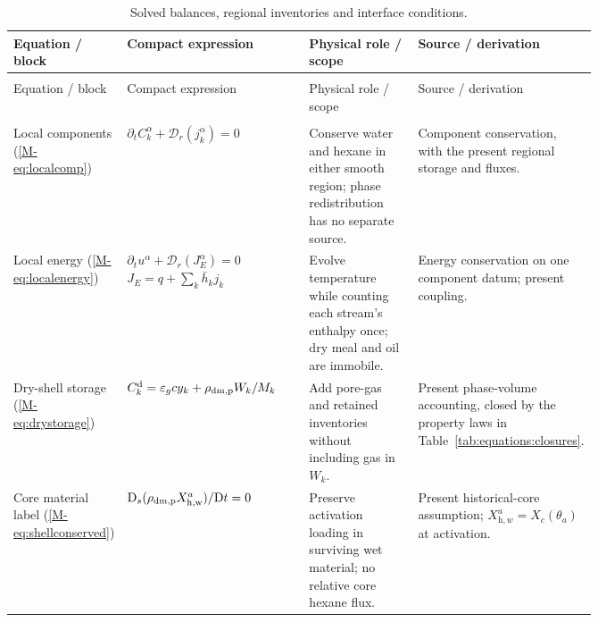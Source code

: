 \begingroup
\small
\setlength{\tabcolsep}{4pt}
\setlength{\LTpre}{6pt}
\setlength{\LTpost}{10pt}
\renewcommand{\arraystretch}{1.12}
\begin{longtable}{@{}>{\raggedright\arraybackslash}p{0.14\linewidth}
>{\raggedright\arraybackslash}p{0.37\linewidth}
>{\raggedright\arraybackslash}p{0.25\linewidth}
>{\raggedright\arraybackslash}p{}@{}}
\caption{Solved balances, regional inventories and interface conditions.}
\label{tab:equations:balances}\\
\toprule
Equation / block & Compact expression & Physical role / scope & Source / derivation\\\midrule
\endfirsthead
\multicolumn{4}{l}{\tablename~\thetable\ (continued)}\\
\toprule
Equation / block & Compact expression & Physical role / scope & Source / derivation\\\midrule
\endhead
\midrule\multicolumn{4}{r}{Continued on next page}\\\endfoot
\bottomrule\endlastfoot
Local components\newline
(\ref*{M-eq:localcomp})
& $\partial_t C_k^\alpha+\mathcal D_r(j_k^\alpha)=0$
& Conserve water and hexane in either smooth region; phase redistribution has no separate source.
& Component conservation, with the present regional storage and fluxes.\\[5pt]
Local energy\newline
(\ref*{M-eq:localenergy})
& $\partial_t u^\alpha+\mathcal D_r(J_E^\alpha)=0$\newline
  $J_E=q+\sum_k\bar h_kj_k$
& Evolve temperature while counting each stream's enthalpy once; dry meal and oil are immobile.
& Energy conservation on one component datum; present coupling.\\[5pt]
Dry-shell storage\newline
(\ref*{M-eq:drystorage})
& $C_k^{\mathrm d}=\varepsilon_gcy_k+\rho_{\mathrm{dm,p}} W_k/M_k$
& Add pore-gas and retained inventories without including gas in $W_k$.
& Present phase-volume accounting, closed by the property laws in Table~\ref{tab:equations:closures}.\\[5pt]
Core material label\newline
(\ref*{M-eq:shellconserved})
& $\mathrm D_s(\rho_{\mathrm{dm,p}}X_{\mathrm{h,w}}^{a})/\mathrm Dt=0$
& Preserve activation loading in surviving wet material; no relative core hexane flux.
& Present historical-core assumption; $X_{\mathrm h,w}^a=X_c(\theta_a)$ at activation.\\[5pt]

\end{longtable}
